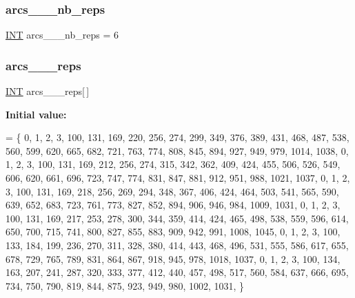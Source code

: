\subsubsection{\texorpdfstring{arcs\+\_\+\_\+\_\+nb\+\_\+reps}{arcs\_32\_34\_nb\_reps}}
{\footnotesize\ttfamily \mbox{\hyperlink{galois_8h_a09fddde158a3a20bd2dcadb609de11dc}{I\+NT}} arcs\+\_\+\_\+\_\+nb\+\_\+reps = 6}

\mbox{\label{data__hyperovals_8_c_ae07cc15a2ce2ebf83e514a321d62af1c}} 
\subsubsection{\texorpdfstring{arcs\+\_\+\_\+\_\+reps}{arcs\_32\_34\_reps}}
{\footnotesize\ttfamily \mbox{\hyperlink{galois_8h_a09fddde158a3a20bd2dcadb609de11dc}{I\+NT}} arcs\+\_\+\_\+\_\+reps\mbox{[}$\,$\mbox{]}}

{\bfseries Initial value\+:}
\begin{DoxyCode}
= \{
    0, 1, 2, 3, 100, 131, 169, 220, 256, 274, 299, 349, 376, 389, 431, 468, 487, 538, 560, 599, 620, 665, 
      682, 721, 763, 774, 808, 845, 894, 927, 949, 979, 1014, 1038, 
    0, 1, 2, 3, 100, 131, 169, 212, 256, 274, 315, 342, 362, 409, 424, 455, 506, 526, 549, 606, 620, 661, 
      696, 723, 747, 774, 831, 847, 881, 912, 951, 988, 1021, 1037, 
    0, 1, 2, 3, 100, 131, 169, 218, 256, 269, 294, 348, 367, 406, 424, 464, 503, 541, 565, 590, 639, 652, 
      683, 723, 761, 773, 827, 852, 894, 906, 946, 984, 1009, 1031, 
    0, 1, 2, 3, 100, 131, 169, 217, 253, 278, 300, 344, 359, 414, 424, 465, 498, 538, 559, 596, 614, 650, 
      700, 715, 741, 800, 827, 855, 883, 909, 942, 991, 1008, 1045, 
    0, 1, 2, 3, 100, 133, 184, 199, 236, 270, 311, 328, 380, 414, 443, 468, 496, 531, 555, 586, 617, 655, 
      678, 729, 765, 789, 831, 864, 867, 918, 945, 978, 1018, 1037, 
    0, 1, 2, 3, 100, 134, 163, 207, 241, 287, 320, 333, 377, 412, 440, 457, 498, 517, 560, 584, 637, 666, 
      695, 734, 750, 790, 819, 844, 875, 923, 949, 980, 1002, 1031, 
\}
\end{DoxyCode}
\mbox{\label{data__hyperovals_8_c_aa12028300d866f9eb4c728c9a245812a}} 
